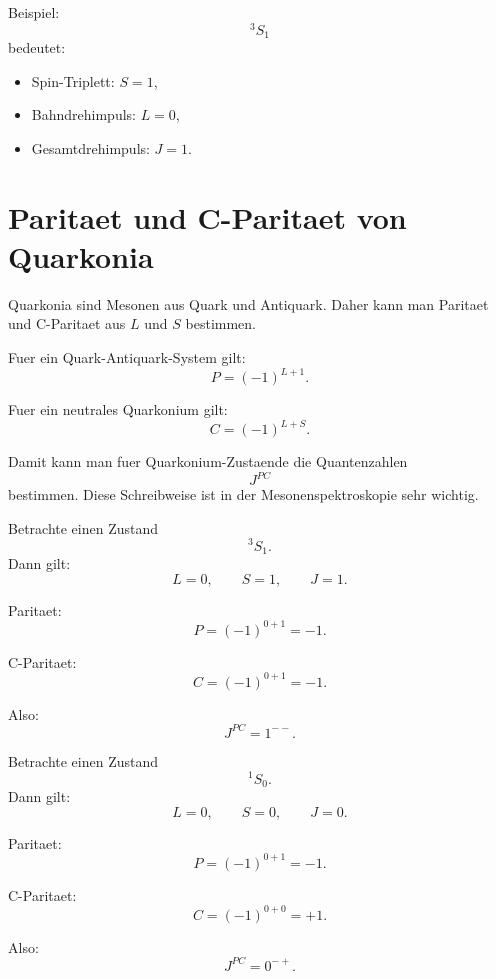 \begin{examtipbox}
Beispiel:
\[
    {}^3S_1
\]
bedeutet:
\begin{itemize}
    \item Spin-Triplett: $S=1$,
    \item Bahndrehimpuls: $L=0$,
    \item Gesamtdrehimpuls: $J=1$.
\end{itemize}
\end{examtipbox}

\section{Paritaet und C-Paritaet von Quarkonia}

Quarkonia sind Mesonen aus Quark und Antiquark.
Daher kann man Paritaet und C-Paritaet aus $L$ und $S$ bestimmen.

\begin{formulabox}
Fuer ein Quark-Antiquark-System gilt:
\[
    P=(-1)^{L+1}.
\]
\end{formulabox}

\begin{formulabox}
Fuer ein neutrales Quarkonium gilt:
\[
    C=(-1)^{L+S}.
\]
\end{formulabox}

\begin{conceptbox}
Damit kann man fuer Quarkonium-Zustaende die Quantenzahlen
\[
    J^{PC}
\]
bestimmen.
Diese Schreibweise ist in der Mesonenspektroskopie sehr wichtig.
\end{conceptbox}

\begin{examplebox}
Betrachte einen Zustand
\[
    {}^3S_1.
\]
Dann gilt:
\[
    L=0,
    \qquad
    S=1,
    \qquad
    J=1.
\]

Paritaet:
\[
    P=(-1)^{0+1}=-1.
\]

C-Paritaet:
\[
    C=(-1)^{0+1}=-1.
\]

Also:
\[
    J^{PC}=1^{--}.
\]
\end{examplebox}

\begin{examplebox}
Betrachte einen Zustand
\[
    {}^1S_0.
\]
Dann gilt:
\[
    L=0,
    \qquad
    S=0,
    \qquad
    J=0.
\]

Paritaet:
\[
    P=(-1)^{0+1}=-1.
\]

C-Paritaet:
\[
    C=(-1)^{0+0}=+1.
\]

Also:
\[
    J^{PC}=0^{-+}.
\]
\end{examplebox}

